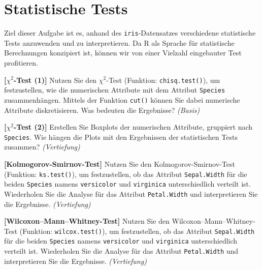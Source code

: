 \documentclass[headinclude,headsepline]{scrartcl}
\newcommand{\taskcategory}[1]{{\color[HTML]{800000}\emph{(#1)}}}
\newcommand{\taskname}[1]{\textbf{[#1]}}
\newcommand{\code}[1]{{\color[HTML]{000080}\texttt{#1}}}
\begin{document}
\section{Statistische Tests}

Ziel dieser Aufgabe ist es, anhand des \code{iris}-Datensatzes verschiedene statistische Tests anzuwenden und zu interpretieren.
Da R als Sprache für statistische Berechnungen konzipiert ist, können wir von einer Vielzahl eingebauter Test profitieren.

\vspace{10pt}

\begin{compactenum}[a)]\itemsep10pt
	\item
	\taskname{$\chi^2$-Test (1)}
	Nutzen Sie den $\chi^2$-Test (Funktion: \code{chisq.test()}), um festzustellen, wie die numerischen Attribute mit dem Attribut \code{Species} zusammenhängen.
	Mittels der Funktion \code{cut()} können Sie dabei numerische Attribute diskretisieren.
	Was bedeuten die Ergebnisse?
	\taskcategory{Basis}
	\item
	\taskname{$\chi^2$-Test (2)}
	Erstellen Sie Boxplots der numerischen Attribute, gruppiert nach \code{Species}.
	Wie hängen die Plots mit den Ergebnissen der statistischen Tests zusammen?
	\taskcategory{Vertiefung}
	\item
	\taskname{Kolmogorov-Smirnov-Test}
	Nutzen Sie den Kolmogorov-Smirnov-Test (Funktion: \code{ks.test()}), um festzustellen, ob das Attribut \code{Sepal.Width} für die beiden \code{Species} namens \code{versicolor} und \code{virginica} unterschiedlich verteilt ist.
	Wiederholen Sie die Analyse für das Attribut \code{Petal.Width} und interpretieren Sie die Ergebnisse.
	\taskcategory{Vertiefung}
	\item
	\taskname{Wilcoxon–Mann–Whitney-Test}
	Nutzen Sie den Wilcoxon–Mann–Whitney-Test (Funktion: \code{wilcox.test()}), um festzustellen, ob das Attribut \code{Sepal.Width} für die beiden \code{Species} namens \code{versicolor} und \code{virginica} unterschiedlich verteilt ist.
	Wiederholen Sie die Analyse für das Attribut \code{Petal.Width} und interpretieren Sie die Ergebnisse.
	\taskcategory{Vertiefung}
\end{compactenum}
\end{document}
